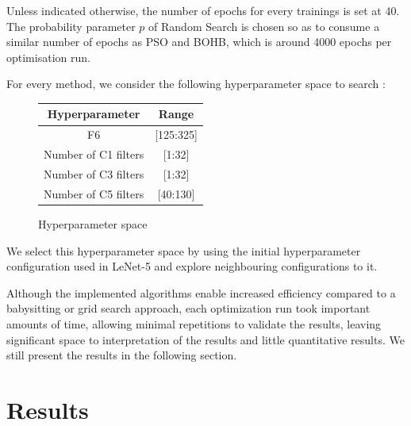 \documentclass[a4 paper,11pt,2]{article}
\begin{document}
Unless indicated otherwise, the number of epochs for every trainings is set at
40. The probability parameter $p$ of Random Search is chosen so as to consume a
similar number of epochs as PSO and BOHB, which is around 4000 epochs per
optimisation run.

For every method, we consider the following hyperparameter space to search :

\begin{figure}[h]
    \centering
    \begin{tabular}{|c|c|}
        \hline
        Hyperparameter       & Range     \\
        \hline
        F6                   & [125:325] \\
        \hline
        Number of C1 filters & [1:32]    \\
        \hline
        Number of C3 filters & [1:32]    \\
        \hline
        Number of C5 filters & [40:130]  \\
        \hline
    \end{tabular}
    \caption{Hyperparameter space}
    \label{tab:hpspace}
\end{figure}

We select this hyperparameter space by using the initial hyperparameter
configuration used in LeNet-5 and explore neighbouring configurations to it.

Although the implemented algorithms enable increased efficiency compared to a
babysitting or grid search approach, each optimization run took important
amounts of time, allowing minimal repetitions to validate the results, leaving
significant space to interpretation of the results and little quantitative
results. We still present the results in the following section.

\section{Results}
\end{document}
